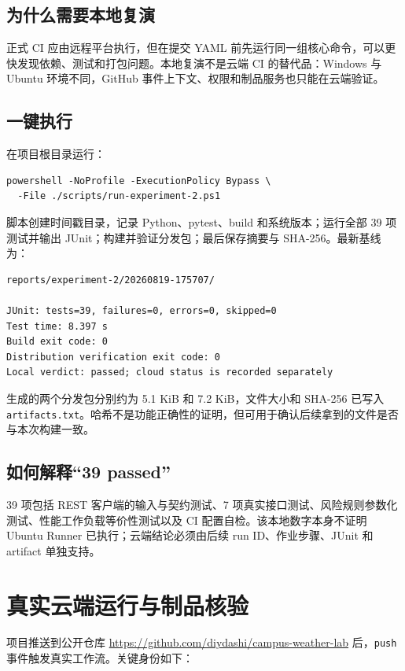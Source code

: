 \documentclass[UTF8,zihao=-4,a4paper]{ctexart}
\newcommand{\code}[1]{\texttt{#1}}
\begin{document}
\subsection{为什么需要本地复演}

正式 CI 应由远程平台执行，但在提交 YAML 前先运行同一组核心命令，可以更快发现依赖、测试和打包问题。本地复演不是云端 CI 的替代品：Windows 与 Ubuntu 环境不同，GitHub 事件上下文、权限和制品服务也只能在云端验证。

\subsection{一键执行}

在项目根目录运行：

\begin{lstlisting}[style=shellstyle]
powershell -NoProfile -ExecutionPolicy Bypass \
  -File ./scripts/run-experiment-2.ps1
\end{lstlisting}

脚本创建时间戳目录，记录 Python、pytest、build 和系统版本；运行全部 39 项测试并输出 JUnit；构建并验证分发包；最后保存摘要与 SHA-256。最新基线为：

\begin{lstlisting}[style=shellstyle]
reports/experiment-2/20260819-175707/

JUnit: tests=39, failures=0, errors=0, skipped=0
Test time: 8.397 s
Build exit code: 0
Distribution verification exit code: 0
Local verdict: passed; cloud status is recorded separately
\end{lstlisting}

生成的两个分发包分别约为 5.1 KiB 和 7.2 KiB，文件大小和 SHA-256 已写入 \code{artifacts.txt}。哈希不是功能正确性的证明，但可用于确认后续拿到的文件是否与本次构建一致。

\subsection{如何解释“39 passed”}

39 项包括 REST 客户端的输入与契约测试、7 项真实接口测试、风险规则参数化测试、性能工作负载等价性测试以及 CI 配置自检。该本地数字本身不证明 Ubuntu Runner 已执行；云端结论必须由后续 run ID、作业步骤、JUnit 和 artifact 单独支持。

\section{真实云端运行与制品核验}

项目推送到公开仓库 \url{https://github.com/diydashi/campus-weather-lab} 后，\code{push} 事件触发真实工作流。关键身份如下：
\end{document}
